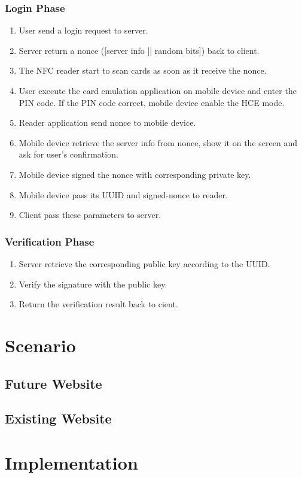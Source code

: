 \begin{CJK}{Bg5}{bsmi}
\subsubsection{Login Phase}

\begin{enumerate}
\item User send a login request to server.
\item Server return a nonce ([server info || random bits]) back to client.
\item The NFC reader start to scan cards as soon as it receive the nonce.
\item User execute the card emulation application on mobile device and enter the PIN code. If the PIN code correct, mobile device enable the HCE mode.
\item Reader application send nonce to mobile device.
\item Mobile device retrieve the server info from nonce, show it on the screen and ask for user's confirmation.
\item Mobile device signed the nonce with corresponding private key.
\item Mobile device pass its UUID and signed-nonce to reader.
\item Client pass these parameters to server.
\end{enumerate}

\subsubsection{Verification Phase}

\begin{enumerate}
\item Server retrieve the corresponding public key according to the UUID.
\item Verify the signature with the public key.
\item Return the verification result back to cient.
\end{enumerate}

\section{Scenario}

\subsection{Future Website}

\subsection{Existing Website}

\section{Implementation}

\end{CJK}